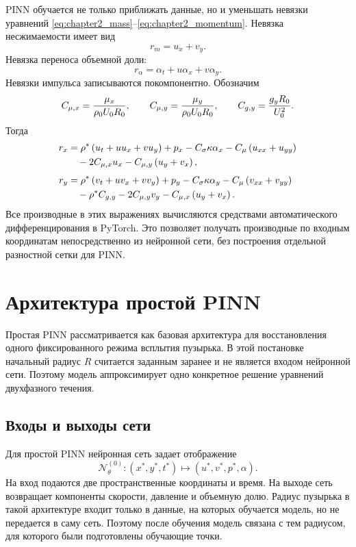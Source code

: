 PINN обучается не только приближать данные, но и уменьшать невязки уравнений
\eqref{eq:chapter2_mass}--\eqref{eq:chapter2_momentum}. Невязка
несжимаемости имеет вид
\begin{equation}
    r_m=u_x+v_y.
\end{equation}
Невязка переноса объемной доли:
\begin{equation}
    r_\alpha=\alpha_t+u\alpha_x+v\alpha_y.
\end{equation}
Невязки импульса записываются покомпонентно. Обозначим
\[
    C_{\mu,x}=\frac{\mu_x}{\rho_0U_0R_0},
    \qquad
    C_{\mu,y}=\frac{\mu_y}{\rho_0U_0R_0},
    \qquad
    C_{g,y}=\frac{g_yR_0}{U_0^2}.
\]
Тогда
\begin{align}
    r_x
    &=
    \rho^*
    \left(u_t+uu_x+vu_y\right)
    +p_x
    -C_\sigma\kappa\alpha_x
    -C_\mu\left(u_{xx}+u_{yy}\right)
    \notag\\
    &\quad
    -2C_{\mu,x}u_x
    -C_{\mu,y}\left(u_y+v_x\right),
    \label{eq:chapter2_rx}
    \\[0.4em]
    r_y
    &=
    \rho^*
    \left(v_t+uv_x+vv_y\right)
    +p_y
    -C_\sigma\kappa\alpha_y
    -C_\mu\left(v_{xx}+v_{yy}\right)
    \notag\\
    &\quad
    -\rho^*C_{g,y}
    -2C_{\mu,y}v_y
    -C_{\mu,x}\left(u_y+v_x\right).
    \label{eq:chapter2_ry}
\end{align}
Все производные в этих выражениях вычисляются средствами автоматического
дифференцирования в PyTorch. Это позволяет получать производные по входным
координатам непосредственно из нейронной сети, без построения отдельной
разностной сетки для PINN.

\section{Архитектура простой PINN}

Простая PINN рассматривается как базовая архитектура для восстановления одного
фиксированного режима всплытия пузырька. В этой постановке начальный радиус
\(R\) считается заданным заранее и не является входом нейронной сети. Поэтому
модель аппроксимирует одно конкретное решение уравнений двухфазного течения.

\subsection{Входы и выходы сети}

Для простой PINN нейронная сеть задает отображение
\[
    \mathcal{N}_{\theta}^{(0)}:
    (x^*,y^*,t^*)\mapsto (u^*,v^*,p^*,\alpha).
\]
На вход подаются две пространственные координаты и время. На выходе сеть
возвращает компоненты скорости, давление и объемную долю. Радиус пузырька в
такой архитектуре входит только в данные, на которых обучается модель, но не
передается в саму сеть. Поэтому после обучения модель связана с тем радиусом,
для которого были подготовлены обучающие точки.

